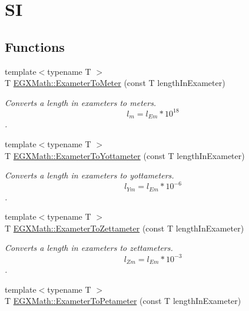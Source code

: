 \hypertarget{group___e_g_x_math-_conversions-_length_conversions-_exameter-_s_i}{}\section{SI}
\label{group___e_g_x_math-_conversions-_length_conversions-_exameter-_s_i}
\subsection*{Functions}
\begin{DoxyCompactItemize}
\item 
{\footnotesize template$<$typename T $>$ }\\T \mbox{\hyperlink{group___e_g_x_math-_conversions-_length_conversions-_exameter-_s_i_ga367c71c371f48790004a1de30a59f2a4}{E\+G\+X\+Math\+::\+Exameter\+To\+Meter}} (const T length\+In\+Exameter)
\begin{DoxyCompactList}\small\item\em Converts a length in exameters to meters. \[ l_{m}=l_{Em} * 10^{18} \]. \end{DoxyCompactList}\item 
{\footnotesize template$<$typename T $>$ }\\T \mbox{\hyperlink{group___e_g_x_math-_conversions-_length_conversions-_exameter-_s_i_ga052b009f7705d8ad81083116d15dec65}{E\+G\+X\+Math\+::\+Exameter\+To\+Yottameter}} (const T length\+In\+Exameter)
\begin{DoxyCompactList}\small\item\em Converts a length in exameters to yottameters. \[ l_{Ym}=l_{Em} * 10^{-6} \]. \end{DoxyCompactList}\item 
{\footnotesize template$<$typename T $>$ }\\T \mbox{\hyperlink{group___e_g_x_math-_conversions-_length_conversions-_exameter-_s_i_gaa971cb3b6d17c5e7772d180b2606e42b}{E\+G\+X\+Math\+::\+Exameter\+To\+Zettameter}} (const T length\+In\+Exameter)
\begin{DoxyCompactList}\small\item\em Converts a length in exameters to zettameters. \[ l_{Zm}=l_{Em} * 10^{-3} \]. \end{DoxyCompactList}\item 
{\footnotesize template$<$typename T $>$ }\\T \mbox{\hyperlink{group___e_g_x_math-_conversions-_length_conversions-_exameter-_s_i_gadf7ed11d79b89826a108cd01e4f67769}{E\+G\+X\+Math\+::\+Exameter\+To\+Petameter}} (const T length\+In\+Exameter)

\end{DoxyCompactItemize}
